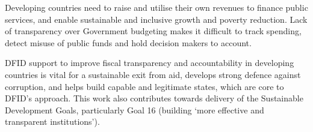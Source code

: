 Developing countries need to raise and utilise their own revenues to finance public services, and enable sustainable and inclusive growth and poverty reduction. %
Lack of transparency over Government budgeting makes it difficult to track spending, detect
misuse of public funds and hold decision makers to account. %

DFID support to improve fiscal transparency and accountability in developing countries is vital for a sustainable exit from aid, develops strong defence against corruption, and helps build capable and legitimate states, which are core to DFID’s approach. %
This work also contributes towards delivery of the Sustainable Development Goals,
particularly Goal 16 (building `more effective and transparent institutions'). %

\newpage

